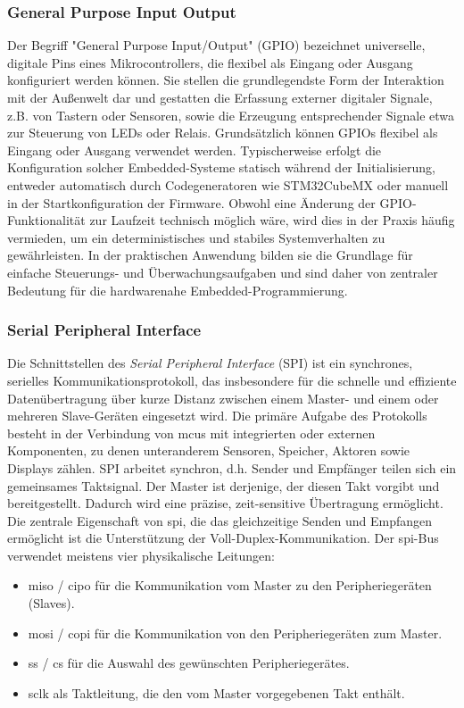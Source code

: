 \subsubsection*{General Purpose Input Output}
Der Begriff "General Purpose Input/Output" (GPIO) bezeichnet universelle, digitale Pins eines Mikrocontrollers, die flexibel als Eingang oder Ausgang konfiguriert werden können.
Sie stellen die grundlegendste Form der Interaktion mit der Außenwelt dar und gestatten die Erfassung externer digitaler Signale, z.B. von Tastern oder Sensoren, sowie die Erzeugung entsprechender Signale etwa zur Steuerung von LEDs oder Relais.
Grundsätzlich können GPIOs flexibel als Eingang oder Ausgang verwendet werden.
Typischerweise erfolgt die Konfiguration solcher Embedded-Systeme statisch während der Initialisierung, entweder automatisch durch Codegeneratoren wie STM32CubeMX oder manuell in der Startkonfiguration der Firmware.
Obwohl eine Änderung der GPIO-Funktionalität zur Laufzeit technisch möglich wäre, wird dies in der Praxis häufig vermieden, um ein deterministisches und stabiles Systemverhalten zu gewährleisten.
In der praktischen Anwendung bilden sie die Grundlage für einfache Steuerungs- und Überwachungsaufgaben und sind daher von zentraler Bedeutung für die hardwarenahe Embedded-Programmierung.

\subsubsection*{Serial Peripheral Interface}
Die Schnittstellen des \emph{Serial Peripheral Interface} (SPI) ist ein synchrones, serielles Kommunikationsprotokoll, das insbesondere für die schnelle und effiziente Datenübertragung über kurze Distanz zwischen einem Master- und einem oder mehreren Slave-Geräten eingesetzt wird. 
Die primäre Aufgabe des Protokolls besteht in der Verbindung von \gls{mcu}s mit integrierten oder externen Komponenten, zu denen unteranderem  Sensoren, Speicher, Aktoren sowie Displays zählen.
SPI arbeitet synchron, d.h. Sender und Empfänger teilen sich ein gemeinsames Taktsignal.
Der Master ist derjenige, der diesen Takt vorgibt und bereitgestellt.
Dadurch wird eine präzise, zeit-sensitive Übertragung ermöglicht. 
Die zentrale Eigenschaft von \gls{spi}, die das gleichzeitige Senden und Empfangen ermöglicht ist die Unterstützung der Voll-Duplex-Kommunikation.
Der \gls{spi}-Bus verwendet meistens vier physikalische Leitungen:
\begin{itemize}
	\item \gls{miso} / \gls{cipo} für die Kommunikation vom Master zu den Peripheriegeräten (Slaves).
	\item \gls{mosi} / \gls{copi} für die Kommunikation von den Peripheriegeräten zum Master.
	\item \gls{ss} / \gls{cs} für die Auswahl des gewünschten Peripheriegerätes.
	\item \gls{sclk} als Taktleitung, die den vom Master vorgegebenen Takt enthält.
\end{itemize}

